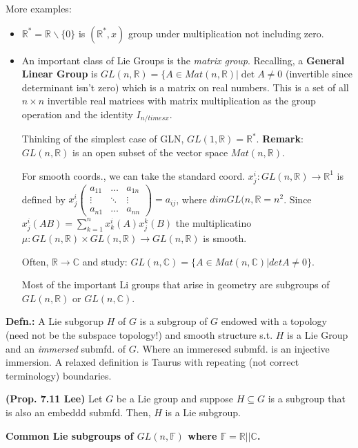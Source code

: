 \documentclass[12pt,letterpaper]{article}
\begin{document}
More examples: 
\begin{itemize}
    \item $\mathbb{R}^* = \mathbb{R} \backslash \{0\} $ is $(\mathbb{R}^*, x) $ group under multiplication not including zero.
    \item An important class of Lie Groups is the \textit{matrix group}. Recalling, a \textbf{General Linear Group} is $GL(n, \mathbb{R}) = \{ A \in Mat(n, \mathbb{R})|\det A \neq 0$ (invertible since determinant isn't zero) which is a matrix on real numbers. This is a set of all $n \times n$ invertible real matrices with matrix multiplication as the group operation and the identity $I_{n /times x}$.
    
    Thinking of the simplest case of GLN, $GL(1, \mathbb{R}) = \mathbb{R}^*$. \textbf{Remark}: $GL(n, \mathbb{R})$ is an open subset of the vector space $Mat(n, \mathbb{R})$. 
    
    For smooth coords., we can take the standard coord. $x^i_j: GL(n, \mathbb{R})\rightarrow \mathbb{R}^1$ is defined by $x^i_j \begin{pmatrix}
a_{11} & \dots & a_{1n}\\
\vdots & \ddots & \vdots \\
a_{n1} & \dots & a_{nn}
\end{pmatrix} = a_{ij}$, where $dimGL(n, \mathbb{R} = n^2$. Since $x^i_j (AB) = \sum_{k=1}^n x^i_k (A) x^k_j(B)$ the multiplicatino $\mu: GL(n, \mathbb{R}) \times GL(n, \mathbb{R}) \rightarrow GL(n, \mathbb{R})$ is smooth.

Often, $\mathbb{R}\rightarrow\mathbb{C}$ and study: $GL(n, \mathbb{C}) = \{ A \in Mat(n, \mathbb{C}) | detA \neq 0\}$. 

Most of the important Li groups that arise in geometry are subgroups of $GL(n, \mathbb{R})$ or $GL(n, \mathbb{C})$.
\end{itemize}

\textbf{Defn.:} A Lie subgorup $H$ of $G$ is a subgroup of $G$ endowed with a topology (need not be the subspace topology!) and smooth structure s.t. $H$ is a Lie Group and an \textit{immersed} submfd. of $G$. Where an immeresed submfd. is an injective immersion. A relaxed definition is Taurus with repeating (not correct terminology) boundaries.

\textbf{(Prop. 7.11 Lee)} Let $G$ be a Lie group and suppose $H \subseteq G$ is a subgroup that is also an embeddd submfd. Then, $H$ is a Lie subgroup. 

\textbf{Common Lie subgroups of $GL(n, \mathbb{F}) $ where $\mathbb{F} = \mathbb{R} || \mathbb{C}$.}
\end{document}
